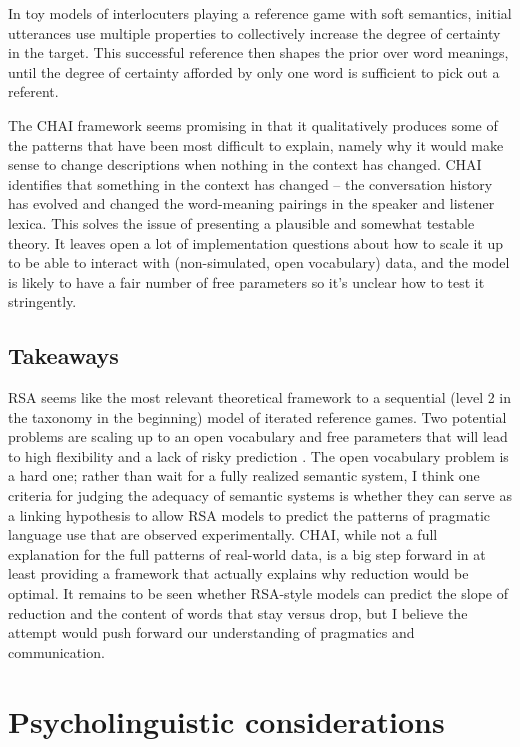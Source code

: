 \documentclass[]{article}
\begin{document}
In toy models of interlocuters playing a reference game with soft semantics, initial utterances use multiple properties to collectively increase the degree of certainty in the target. This successful reference then shapes the prior over word meanings, until the degree of certainty afforded by only one word is sufficient to pick out a referent. 

The CHAI framework seems promising in that it qualitatively produces some of the patterns that have been most difficult to explain, namely why it would make sense to change descriptions when nothing in the context has changed. CHAI identifies that something in the context has changed -- the conversation history has evolved and changed the word-meaning pairings in the speaker and listener lexica. This solves the issue of presenting a plausible and somewhat testable theory. It leaves open a lot of implementation questions about how to scale it up to be able to interact with (non-simulated, open vocabulary) data, and the model is likely to have a fair number of free parameters so it's unclear how to test it stringently. 



\subsection{Takeaways}


RSA seems like the most relevant theoretical framework to a sequential (level 2 in the taxonomy in the beginning) model of iterated reference games. Two potential problems are scaling up to an open vocabulary and free parameters that will lead to high flexibility and a lack of risky prediction \citep{meehl1990}. The open vocabulary problem is a hard one; rather than wait for a fully realized semantic system, I think one criteria for judging the adequacy of semantic systems is whether they can serve as a linking hypothesis to allow RSA models to predict the patterns of pragmatic language use that are observed experimentally. CHAI, while not a full explanation for the full patterns of real-world data, is a big step forward in at least providing a framework that actually explains why reduction would be optimal. It remains to be seen whether RSA-style models can predict the slope of reduction and the content of words that stay versus drop, but I believe the attempt would push forward our understanding of pragmatics and communication. 

\section{Psycholinguistic considerations}
\end{document}
